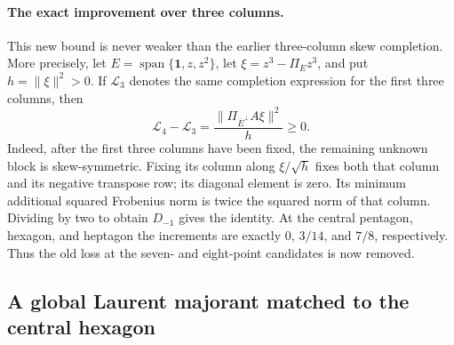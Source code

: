 \documentclass[11pt]{article}
\theoremstyle{remark}
\numberwithin{equation}{section}
\begin{document}
\paragraph{The exact improvement over three columns.}
This new bound is never weaker than the earlier three-column skew
completion. More precisely, let $E=\operatorname{span}\{\mathbf1,z,z^2\}$,
let $\xi=z^3-\Pi_Ez^3$, and put $h=\|\xi\|^2>0$.
If $\mathcal L_3$ denotes the same completion expression for the
first three columns, then
\begin{equation}\label{eq:noorigin-oct8-skew-increment}
 \mathcal L_4-\mathcal L_3
       =\frac{\|\Pi_{\overline E^{\perp}}A\xi\|^2}{h}\ge0.
\end{equation}
Indeed, after the first three columns have been fixed, the remaining
unknown block is skew-symmetric. Fixing its column along
$\xi/\sqrt h$ fixes both that column and its negative transpose row;
its diagonal element is zero. Its minimum additional squared
Frobenius norm is twice the squared norm of that column. Dividing
by two to obtain $D_{-1}$ gives the identity.
At the central pentagon, hexagon, and heptagon the increments are
exactly $0$, $3/14$, and $7/8$, respectively. Thus the old loss at
the seven- and eight-point candidates is now removed.

\subsection{A global Laurent majorant matched to the central hexagon}
\end{document}
